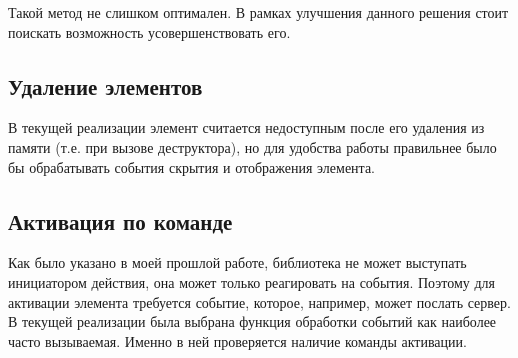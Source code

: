 Такой метод не слишком оптимален. В рамках улучшения данного решения стоит
поискать возможность усовершенствовать его.

\subsection{Удаление элементов}

В текущей реализации элемент считается недоступным после его удаления из памяти
(т.е. при вызове деструктора), но для удобства работы правильнее было бы
обрабатывать события скрытия и отображения элемента.

\subsection{Активация по команде}

Как было указано в моей прошлой работе\cite{polshakovinject}, библиотека не
может выступать инициатором действия, она может только реагировать на события.
Поэтому для активации элемента требуется событие, которое, например, может
послать сервер. В текущей реализации была выбрана функция обработки событий как
наиболее часто вызываемая. Именно в ней проверяется наличие команды активации.
